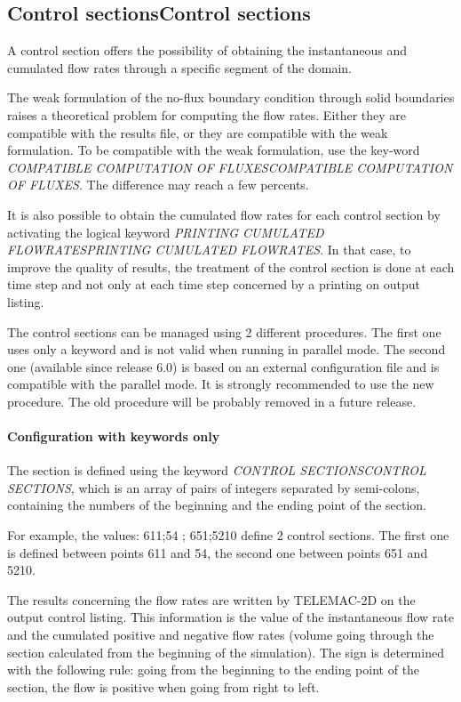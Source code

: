 \documentclass{article} %
\begin{document}
\subsection{ Control sectionsControl sections}

 A control section offers the possibility of obtaining the instantaneous and cumulated flow rates through a specific segment of the domain.

 The weak formulation of the no-flux boundary condition through solid boundaries raises a theoretical problem for computing the flow rates. Either they are compatible with the results file, or they are compatible with the weak formulation. To be compatible with the weak formulation, use the key-word \textit{COMPATIBLE COMPUTATION OF FLUXESCOMPATIBLE COMPUTATION OF FLUXES}. The difference may reach a few percents.

 It is also possible to obtain the cumulated flow rates for each control section by activating the logical keyword \textit{PRINTING CUMULATED FLOWRATESPRINTING CUMULATED FLOWRATES}. In that case, to improve the quality of results, the treatment of the control section is done at each time step and not only at each time step concerned by a printing on output listing.

 The control sections can be managed using 2 different procedures. The first one uses only a keyword and is not valid when running in parallel mode. The second one (available since release 6.0) is based on an external configuration file and is compatible with the parallel mode. It is strongly recommended to use the new procedure. The old procedure will be probably removed in a future release.


\paragraph{ Configuration with keywords only}

 The section is defined using the keyword \textit{CONTROL SECTIONSCONTROL SECTIONS}, which is an array of pairs of integers separated by semi-colons, containing the numbers of the beginning and the ending point of the section.

 For example, the values: 611;54 ; 651;5210 define 2 control sections. The first one is defined between points 611 and 54, the second one between points 651 and 5210.

 The results concerning the flow rates are written by TELEMAC-2D on the output control listing. This information is the value of the instantaneous flow rate and the cumulated positive and negative flow rates (volume going through the section calculated from the beginning of the simulation). The sign is determined with the following rule: going from the beginning to the ending point of the section, the flow is positive when going from right to left.
\end{document}
